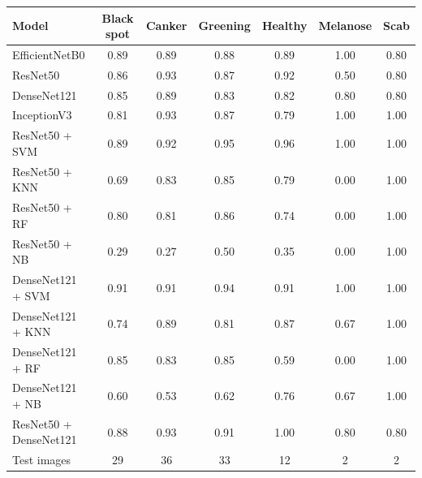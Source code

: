 \begin{tabular}{lcccccc}
\toprule
Model & Black spot & Canker & Greening & Healthy & Melanose & Scab \\
\midrule
EfficientNetB0 & 0.89 & 0.89 & 0.88 & 0.89 & 1.00 & 0.80 \\
ResNet50 & 0.86 & 0.93 & 0.87 & 0.92 & 0.50 & 0.80 \\
DenseNet121 & 0.85 & 0.89 & 0.83 & 0.82 & 0.80 & 0.80 \\
InceptionV3 & 0.81 & 0.93 & 0.87 & 0.79 & 1.00 & 1.00 \\
ResNet50 + SVM & 0.89 & 0.92 & 0.95 & 0.96 & 1.00 & 1.00 \\
ResNet50 + KNN & 0.69 & 0.83 & 0.85 & 0.79 & 0.00 & 1.00 \\
ResNet50 + RF & 0.80 & 0.81 & 0.86 & 0.74 & 0.00 & 1.00 \\
ResNet50 + NB & 0.29 & 0.27 & 0.50 & 0.35 & 0.00 & 1.00 \\
DenseNet121 + SVM & 0.91 & 0.91 & 0.94 & 0.91 & 1.00 & 1.00 \\
DenseNet121 + KNN & 0.74 & 0.89 & 0.81 & 0.87 & 0.67 & 1.00 \\
DenseNet121 + RF & 0.85 & 0.83 & 0.85 & 0.59 & 0.00 & 1.00 \\
DenseNet121 + NB & 0.60 & 0.53 & 0.62 & 0.76 & 0.67 & 1.00 \\
ResNet50 + DenseNet121 & 0.88 & 0.93 & 0.91 & 1.00 & 0.80 & 0.80 \\
\midrule
Test images & 29 & 36 & 33 & 12 & 2 & 2 \\
\bottomrule
\end{tabular}
